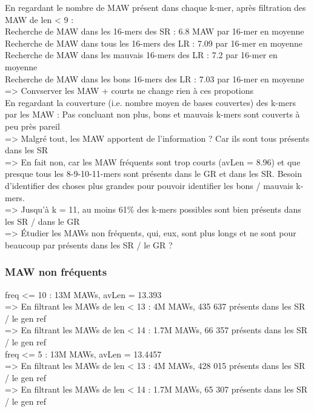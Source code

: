 \documentclass[12pt]{article}
\begin{document}
En regardant le nombre de MAW présent dans chaque k-mer, après filtration des MAW de len < 9 : \\
Recherche de MAW dans les 16-mers des SR : 6.8 MAW par 16-mer en moyenne \\
Recherche de MAW dans tous les 16-mers des LR : 7.09 par 16-mer en moyenne \\
Recherche de MAW dans les mauvais 16-mers des LR : 7.2 par 16-mer en moyenne \\
Recherche de MAW dans les bons 16-mers des LR : 7.03 par 16-mer en moyenne \\
=> Convserver les MAW + courts ne change rien à ces propotions \\

En regardant la couverture (i.e. nombre moyen de bases couvertes) des k-mers par les MAW : Pas concluant non plus, bons et mauvais k-mers
sont couverts à peu près pareil \\

=> Malgré tout, les MAW apportent de l'information ? Car ils sont tous présents dans les SR \\

=> En fait non, car les MAW fréquents sont trop courts (avLen = 8.96) et que presque tous les 8-9-10-11-mers sont présents dans le GR et dans les SR. Besoin d'identifier des choses plus grandes pour pouvoir identifier les bons / mauvais k-mers. \\
=> Jusqu'à k = 11, au moins 61\% des k-mers possibles sont bien présents dans les SR / dans le GR \\

=> Étudier les MAWs non fréquents, qui, eux, sont plus longs et ne sont pour beaucoup par présents dans les SR / le GR ? 

\subsubsection{MAW non fréquents}

freq <= 10 : 13M MAWs, avLen = 13.393 \\
=> En filtrant les MAWs de len < 13 : 4M MAWs, 435 637 présents dans les SR / le gen ref \\
=> En filtrant les MAWs de len < 14 : 1.7M MAWs, 66 357 présents dans les SR / le gen ref \\

freq <= 5 : 13M MAWs, avLen = 13.4457 \\
=> En filtrant les MAWs de len < 13 : 4M MAWs, 428 015 présents dans les SR / le gen ref \\
=> En filtrant les MAWs de len < 14 : 1.7M MAWs, 65 307 présents dans les SR / le gen ref \\
\end{document}
